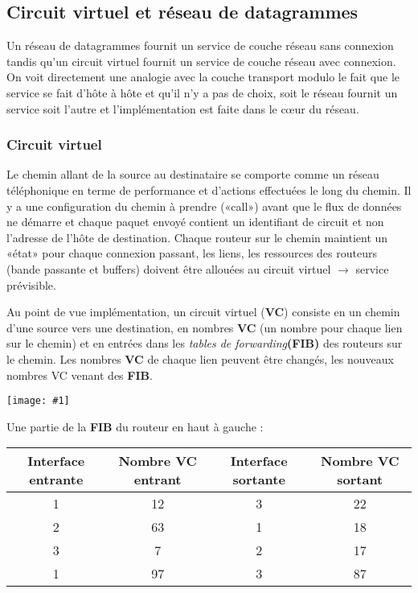\documentclass{article}
\newcommand{\imgR}[2]{\begin{center}\texttt{[image: \#1]}\end{center}}
\begin{document}
\subsection{Circuit virtuel et réseau de datagrammes}

Un réseau de datagrammes fournit un service de couche réseau sans connexion tandis qu'un circuit virtuel fournit 
un service de couche réseau avec connexion. On voit directement une analogie avec la couche transport modulo le 
fait que le service se fait d'hôte à hôte et qu'il n'y a pas de choix, soit le réseau fournit un service soit 
l'autre et l'implémentation est faite dans le c\oe ur du réseau. 

\subsubsection{Circuit virtuel}

Le chemin allant de la source au destinataire se comporte comme un réseau téléphonique en terme de performance 
et d'actions effectuées le long du chemin. Il y a une configuration du chemin à prendre («call») avant que le 
flux de données ne démarre et chaque paquet envoyé contient un identifiant de circuit et non l'adresse de l'hôte 
de destination. Chaque routeur sur le chemin maintient un «état» pour chaque connexion passant, les liens, 
les ressources des routeurs (bande passante et buffers) doivent être allouées au circuit virtuel $\rightarrow$ 
service prévisible.

Au point de vue implémentation, un circuit virtuel (\textbf{VC}) consiste en un chemin d'une source vers une 
destination, en nombres \textbf{VC} (un nombre pour chaque lien sur le chemin) et en entrées dans les 
\textit{tables de forwarding}\textbf{(FIB)} des routeurs sur le chemin. Les nombres \textbf{VC} de chaque lien 
peuvent être changés, les nouveaux nombres VC venant des \textbf{FIB}.

\imgR{CN_069.png}{200}

Une partie de la \textbf{FIB} du routeur en haut à gauche : 

\begin{center}
	\begin{tabular}{|*{4}{c|}}
	\hline
	Interface entrante & Nombre \textbf{VC} entrant & Interface sortante & Nombre \textbf{VC} sortant \\
	\hline
	1 & 12 & 3 & 22 \\
	\hline
	2 & 63 & 1 & 18 \\
	\hline
	3 & 7 & 2 & 17 \\
	\hline
	1 & 97 & 3 & 87 \\
	\hline
	\end{tabular}
\end{center}
\end{document}
